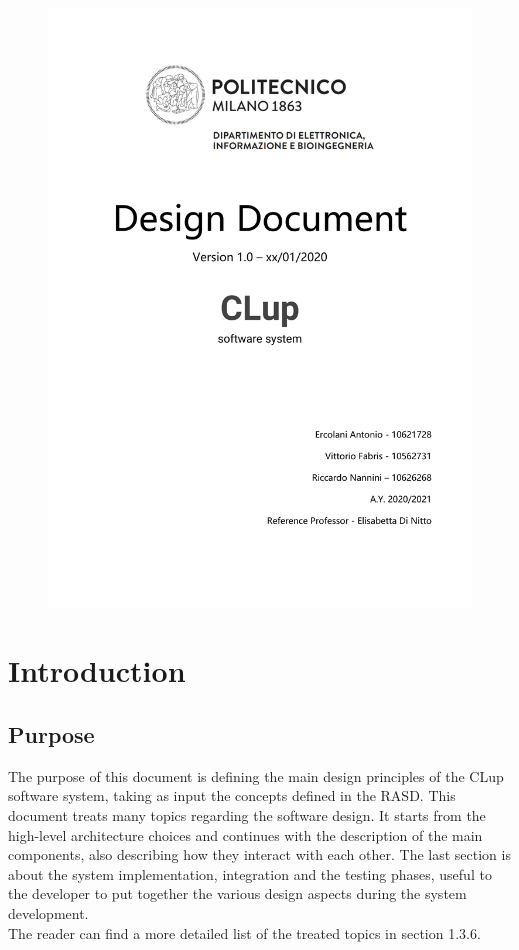 \documentclass[]{article}
\begin{document}
	
	\begin{figure}[H]
		\centering
		\includegraphics[scale=0.29]{FrontPage.png}
	\end{figure}
	

	\newpage


	\tableofcontents
	
	\newpage
	
	
	\section{Introduction}
	
	\bigskip
	\subsection{Purpose}
	The purpose of this document is defining the main design principles of the CLup software system, taking as input the concepts defined in the RASD. This document treats many topics regarding the software design. It starts from the high-level architecture choices and continues with the description of the main components, also describing how they interact with each other. The last section is about the system implementation, integration and the testing phases, useful to the developer to put together the various design aspects during the system development. 
	\\The reader can find a more detailed list of the treated topics in section 1.3.6.
	
\end{document}
